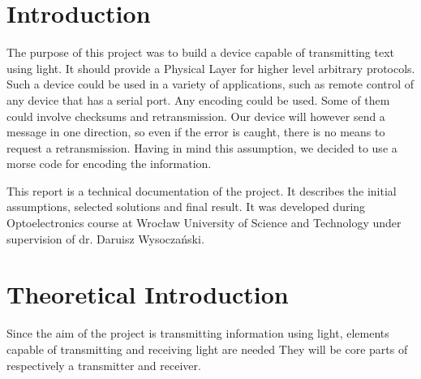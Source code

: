 \documentclass[12pt]{article}
\begin{document}
	\section{Introduction}
  The purpose of this project was to build a device capable of transmitting text using light. It should provide a Physical Layer for higher level arbitrary protocols.
  Such a device could be used in a variety of applications, such as remote control of any device that has a serial port.
  Any encoding could be used. Some of them could involve checksums and retransmission. Our device will however send a message in one direction, so even if the error is caught,
  there is no means to request a retransmission. Having in mind this assumption, we decided to use a morse code for encoding the information.

  This report is a technical documentation of the project. It describes the initial assumptions, selected solutions and final result.
  It was developed during Optoelectronics course at Wrocław University of Science and Technology under supervision of dr. Daruisz Wysoczański.

	
	\section{Theoretical Introduction}
  Since the aim of the project is transmitting information using light, elements capable of transmitting and receiving light are needed
  They will be core parts of respectively a transmitter and receiver.
\end{document}
